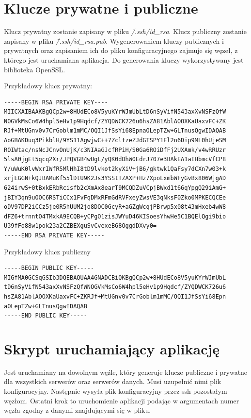\section{Klucze prywatne i publiczne}
Klucz prywatny zostanie zapisany w pliku \textit{\~/.ssh/id\_rsa}.
Klucz publiczny zostanie zapisany w pliku \textit{\~/.ssh/id\_rsa.pub}.
Wygenerowaniem kluczy publicznych i prywatnych oraz zapisaniem ich do pliku
konfiguracyjnego zajmuje się węzeł, z którego jest uruchamiana aplikacja. Do generowania kluczy wykorzystywany jest biblioteka OpenSSL.

Przykładowy klucz prywatny:
\begin{lstlisting}[style=incode]
-----BEGIN RSA PRIVATE KEY----
MIICXAIBAAKBgQCp2w+8HUdECo8V5yuKYrWJmUbLtD6nSyVifN543axXvNSFzQfW
NOGVkMsCo6W4hpl5eHv1p9Hqdcf/ZYQDWCK726u6hsZA81AblAOOXKaUaxvFC+ZK
RJf+MtUGnv0v7CrGoblm1mMC/OQI1JfSsYi68EpnaOLepTZw+GLTnusQgwIDAQAB
AoGBAKDuq3PikblH/9YS11AgwjwC++7ZcltzeZJdGTSPY1El2n6Dip9ML0hUjeSM
ROIWtac/nsNcJCnvOnUjK/c3NIAaGJcfRPiH/S0Ga6ROiDfFj2UXAmk/v4wRRUzr
5lsA0jgEt5qcq2Xr/JPQVGB4wUgL/yQK0dDhW0EdrJ707e3BAkEA1aIHbmcVfCP8
Y/uWuK0lvWxrIWfR5MlHhI8tD9lvkot2kyXiV+jB6/gktwk1QaFsy7dCXn7w03+k
xrjEGGN+kQJBAMuKf55lDtU9K2Js3YSStTZAXP+Hz7XpoLxmbWFyGvBx806WjgAD
624irwS+0tBxkERbRcisfb2cXmAx8earT9MCQDZuVCpjBWxd1t66qYpgQ29iAmG+
jBIY3qn9uOOC6RSTiCCx1FvFqDMxRFmGdRVFxeyZwsVE3qNksF0Zko0MPKECQCEe
oDV97DP2iCCz5je0R5hUUM2jo8DOC0GcyR+aGZgWcqjPBrwp5x08t43mHxeb4wW8
dFZ6+trnntO4TMxkA9ECQB+yCPgO1zisJWYuD46KISoesYhwHe5C1BQElQgi9bio
U39fFo88w1pok23a2CZBEXguSvCvexeB68OggdDXvy0=
-----END RSA PRIVATE KEY-----
\end{lstlisting}

Przykładowy klucz publiczny
\begin{lstlisting}[style=incode]
-----BEGIN PUBLIC KEY----- 
MIGfMA0GCSqGSIb3DQEBAQUAA4GNADCBiQKBgQCp2w+8HUdECo8V5yuKYrWJmUbL
tD6nSyVifN543axXvNSFzQfWNOGVkMsCo6W4hpl5eHv1p9Hqdcf/ZYQDWCK726u6
hsZA81AblAOOXKaUaxvFC+ZKRJf+MtUGnv0v7CrGoblm1mMC/OQI1JfSsYi68Epn
aOLepTZw+GLTnusQgwIDAQAB
-----END PUBLIC KEY-----
\end{lstlisting}


\section{Skrypt uruchamiający aplikację}
Jest uruchamiany na dowolnym węźle, który generuje klucze publiczne i prywatne dla wszystkich serwerów oraz serwerów danych. Musi uzupełnić nimi plik konfiguracyjny. Następnie wysyła plik konfiguracyjny przez ssh pozostałym węzłom. Ostatni krok to uruchomienie aplikacji podając w argumentach numer węzła zgodny z danymi znajdującymi się w pliku.